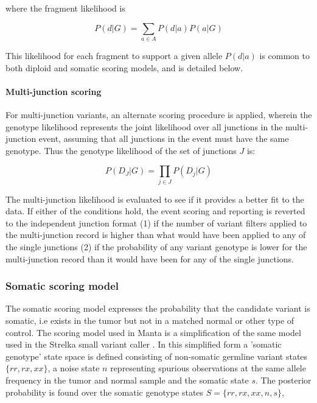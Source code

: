 \documentclass{article}
\begin{document}
\noindent
where the fragment likelihood is

\begin{equation*}
P(d \vert G) = \sum_{a \in A} P(d \vert a) P(a|G)
\end{equation*}

This likelihood for each fragment to support a given allele $P(d \vert a)$ is common to both diploid and somatic scoring models, and is detailed below.

\paragraph{Multi-junction scoring}

For multi-junction variants, an alternate scoring procedure is applied, wherein the genotype likelihood represents the joint likelihood over all junctions in the multi-junction event, assuming that all junctions in the event must have the same genotype. Thus the genotype likelihood of the set of junctions $J$ is:

\begin{equation*}
P(D_{J} \vert G) = \prod_{j \in J} P(D_{j} \vert G)
\end{equation*}

The multi-junction likelihood is evaluated to see if it provides a better fit to the data. If either of the conditions hold, the event scoring and reporting is reverted to the independent junction format (1) if the number of variant filters applied to the multi-junction record is higher than what would have been applied to any of the single junctions (2) if the probability of any variant genotype is lower for the multi-junction record than it would have been for any of the single junctions.

\subsubsection{Somatic scoring model}

The somatic scoring model expresses the probability that the candidate variant is somatic, i.e exists in the tumor but not in a matched normal or other type of control. The scoring model used in Manta is a simplification of the same model used in the Strelka small variant caller \cite{strelka2012}. In this simplified form a 'somatic genotype' state space is defined consisting of non-somatic germline variant states $\{rr, rx, xx\}$, a noise state $n$ representing spurious observations at the same allele frequency in the tumor and normal sample and the somatic state $s$. The posterior probability is found over the somatic genotype states $S = \{rr,rx,xx,n,s\}$,
\end{document}
